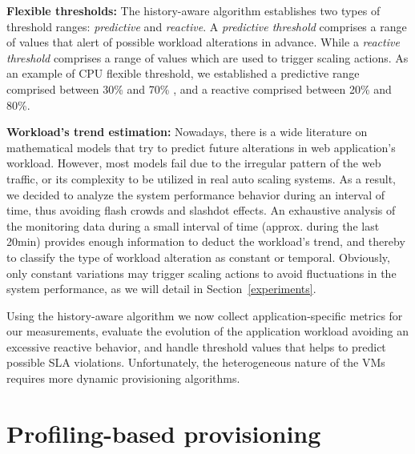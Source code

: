 \textbf{Flexible thresholds:} The history-aware algorithm establishes two types of threshold ranges: \emph{predictive} and \emph{reactive}. A \emph{predictive threshold} comprises a range of values that alert of possible workload alterations in advance. While a \emph{reactive threshold} comprises a range of values which are used to trigger scaling actions. As an example of CPU flexible threshold, we established a predictive range comprised between 30\% and 70\% , and a reactive comprised between 20\% and 80\%.  

\textbf{Workload's trend estimation:} Nowadays, there is a wide literature on mathematical models that try to predict future alterations in web application's workload. However, most models fail due to the irregular pattern of the web traffic, or its complexity to be utilized in real auto scaling systems. As a result, we decided to analyze the system performance behavior during an interval of time, thus avoiding flash crowds and slashdot effects. An exhaustive analysis of the monitoring data during a small interval of time (approx. during the last 20min) provides enough information to deduct the workload's trend, and thereby to classify the type of workload alteration as constant or temporal. Obviously, only constant variations may trigger scaling actions to avoid fluctuations in the system performance, as we will detail in Section~\ref{experiments}.


Using the history-aware algorithm we now collect application-specific metrics for our measurements, evaluate the evolution of the application workload avoiding an excessive reactive behavior, and handle threshold values that helps to predict possible SLA violations. Unfortunately, the heterogeneous nature of the VMs requires more dynamic provisioning algorithms. 



\section*{Profiling-based provisioning}


